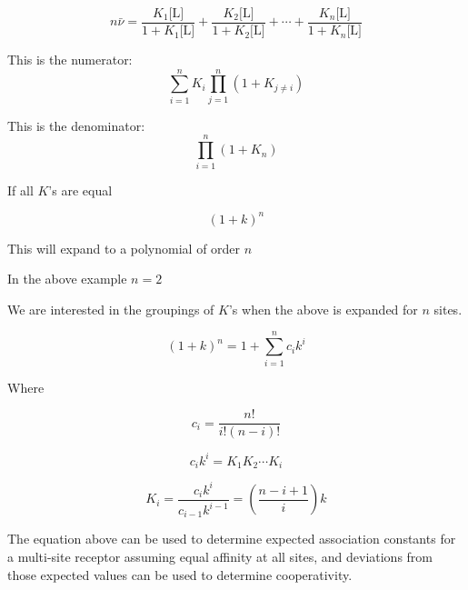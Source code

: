 \begin{equation}
n \bar{\nu} =	\frac{K_1 \text{[L]}}{1+K_1 \text{[L]}} + \frac{K_2 \text{[L]}}{1+K_2 \text{[L]}} + \cdots + \frac{K_n \text{[L]}}{1+K_n \text{[L]}}
\end{equation}

This is the numerator:
\begin{equation}
	\sum_{i=1}^{n} K_i \prod_{j=1}^{n} (1 + K_{j \neq i})
\end{equation}

This is the denominator:
\begin{equation}
	\prod_{i=1}^{n}(1 + K_n)
\end{equation}

If all \(K\)'s are equal

\begin{equation}
	(1 + k)^n
\end{equation}

This will expand to a polynomial of order \(n\) 

In the above example \(n = 2\)

We are interested in the groupings of \(K\)'s when the above is expanded for \(n\) sites.

\begin{equation}
	(1 + k)^n = 1 + \sum_{i=1}^{n} c_i k^i
\end{equation}

Where 

\begin{equation}
	c_i = \frac{n!}{i! (n-i)!}
\end{equation}

\begin{equation}
	c_i k^i = K_1 K_2 \cdots K_i 
\end{equation}

\begin{equation}
	K_i = \frac{c_i k^i}{c_{i-1} k^{i-1}} = \left(\frac{n - i + 1}{i}\right) k
\end{equation}

The equation above can be used to determine expected association constants for a multi-site receptor assuming equal affinity at all sites, and deviations from those expected values can be used to determine cooperativity.


	
\clearpage
